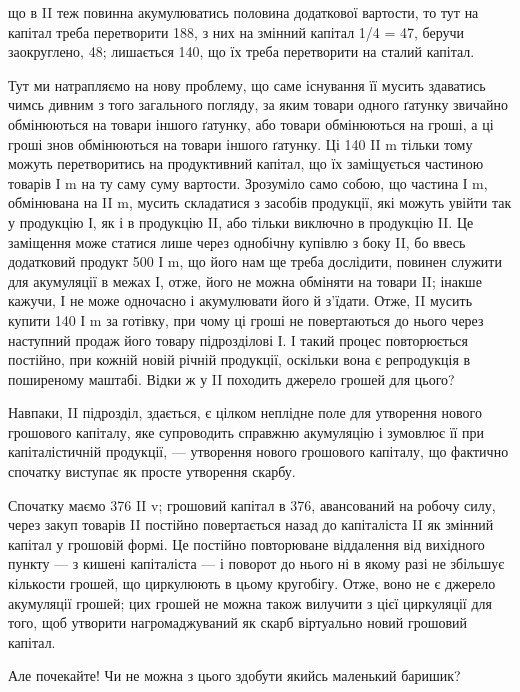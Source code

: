 \parcont{}  %
що в II теж повинна акумулюватись половина додаткової вартости,
то тут на капітал треба перетворити 188, з них на змінний капітал
1/4 = 47, беручи заокруглено, 48; лишається 140, що їх треба
перетворити на сталий капітал.

Тут ми натрапляємо на нову проблему, що саме існування її мусить
здаватись чимсь дивним з того загального погляду, за яким
товари одного ґатунку звичайно обмінюються на товари іншого ґатунку,
або товари обмінюються на гроші, а ці гроші знов обмінюються на
товари іншого ґатунку. Ці 140 II m тільки тому можуть перетворитись
на продуктивний капітал, що їх заміщується частиною товарів І m на
ту саму суму вартости. Зрозуміло само собою, що частина І m, обмінювана
на II m, мусить складатися з засобів продукції, які можуть
увійти так у продукцію І, як і в продукцію II, або тільки виключно
в продукцію II. Це заміщення може статися лише через
однобічну купівлю з боку II, бо ввесь додатковий продукт 500 І m, що
його нам ще треба дослідити, повинен служити для акумуляції в межах І,
отже, його не можна обміняти на товари II; інакше кажучи, І не може
одночасно і акумулювати його й з’їдати. Отже, II мусить купити 140 І m
за готівку, при чому ці гроші не повертаються до нього через наступний
продаж його товару підрозділові І. І такий процес повторюється постійно,
при кожній новій річній продукції, оскільки вона є репродукція в поширеному
маштабі. Відки ж у II походить джерело грошей для цього?

Навпаки, II підрозділ, здається, є цілком неплідне поле для утворення
нового грошового капіталу, яке супроводить справжню акумуляцію і
зумовлює її при капіталістичній продукції, — утворення нового грошового
капіталу, що фактично спочатку виступає як просте утворення
скарбу.

Спочатку маємо 376 II v; грошовий капітал в 376, авансований на
робочу силу, через закуп товарів II постійно повертається назад до
капіталіста II як змінний капітал у грошовій формі. Це постійно повторюване
віддалення від вихідного пункту — з кишені капіталіста — і поворот
до нього ні в якому разі не збільшує кількости грошей, що
циркулюють в цьому кругобігу. Отже, воно не є джерело акумуляції
грошей; цих грошей не можна також вилучити з цієї циркуляції для
того, щоб утворити нагромаджуваний як скарб віртуально новий грошовий
капітал.

Але почекайте! Чи не можна з цього здобути якийсь маленький
баришик?

